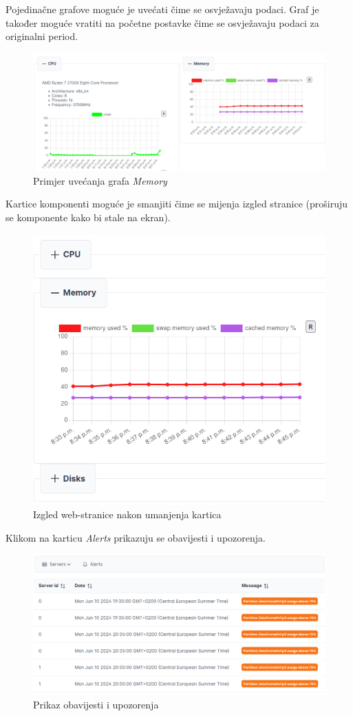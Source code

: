 \documentclass[zavrsnirad]{fer}
\begin{document}
Pojedinačne grafove moguće je uvećati čime se osvježavaju podaci. Graf je također moguće vratiti na početne postavke čime se osvježavaju podaci za originalni period.
\begin{figure}[htb]
	\centering
	\includegraphics[width=1\linewidth]{images/web_3.png} 
	\caption{Primjer uvećanja grafa \textit{Memory}}
\end{figure}
\FloatBarrier

Kartice komponenti moguće je smanjiti čime se mijenja izgled stranice (proširuju se komponente kako bi stale na ekran).
\begin{figure}[htb]
	\centering
	\includegraphics[width=0.75\linewidth]{images/web_4.png} 
	\caption{Izgled web-stranice nakon umanjenja kartica}
\end{figure}
\FloatBarrier

Klikom na karticu \textit{Alerts} prikazuju se obavijesti i upozorenja.
\begin{figure}[htb]
	\centering
	\includegraphics[width=1\linewidth]{images/web_5.png} 
	\caption{Prikaz obavijesti i upozorenja}
\end{figure}
\FloatBarrier
\end{document}
